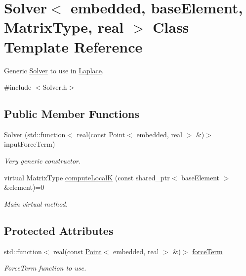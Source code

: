 \hypertarget{class_solver}{}\section{Solver$<$ embedded, base\+Element, Matrix\+Type, real $>$ Class Template Reference}
\label{class_solver}


Generic \hyperlink{class_solver}{Solver} to use in \hyperlink{class_laplace}{Laplace}.  




{\ttfamily \#include $<$Solver.\+h$>$}

\subsection*{Public Member Functions}
\begin{DoxyCompactItemize}
\item 
\hyperlink{class_solver_a0f04e08f93310bc82f9a2efeaffe6db3}{Solver} (std\+::function$<$ real(const \hyperlink{class_point}{Point}$<$ embedded, real $>$ \&)$>$ input\+Force\+Term)\hypertarget{class_solver_a0f04e08f93310bc82f9a2efeaffe6db3}{}\label{class_solver_a0f04e08f93310bc82f9a2efeaffe6db3}

\begin{DoxyCompactList}\small\item\em Very generic constructor. \end{DoxyCompactList}\item 
virtual Matrix\+Type \hyperlink{class_solver_a0049c7be12e2124c717d4db0128ad4b0}{compute\+LocalK} (const shared\+\_\+ptr$<$ base\+Element $>$ \&element)=0
\begin{DoxyCompactList}\small\item\em Main virtual method. \end{DoxyCompactList}\end{DoxyCompactItemize}
\subsection*{Protected Attributes}
\begin{DoxyCompactItemize}
\item 
std\+::function$<$ real(const \hyperlink{class_point}{Point}$<$ embedded, real $>$ \&)$>$ \hyperlink{class_solver_a47ab975c6f2e6312ee5d865d6aec02cd}{force\+Term}\hypertarget{class_solver_a47ab975c6f2e6312ee5d865d6aec02cd}{}\label{class_solver_a47ab975c6f2e6312ee5d865d6aec02cd}

\begin{DoxyCompactList}\small\item\em Force\+Term function to use. \end{DoxyCompactList}\end{DoxyCompactItemize}


